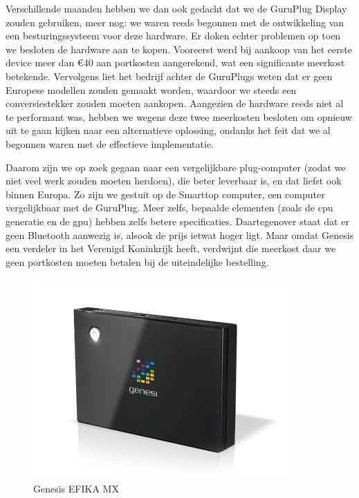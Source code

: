Verschillende maanden hebben we dan ook gedacht dat we de GuruPlug Display zouden gebruiken, meer nog: we waren reeds begonnen met de ontwikkeling van een besturingssysteem voor deze hardware. Er doken echter problemen op toen we besloten de hardware aan te kopen. Vooreerst werd bij aankoop van het eerste device meer dan \euro 40 aan portkosten aangerekend, wat een significante meerkost betekende. Vervolgens liet het bedrijf achter de GuruPlugs weten dat er geen Europese modellen zouden gemaakt worden, waardoor we steeds een conversiestekker zouden moeten aankopen. Aangezien de hardware reeds niet al te performant was, hebben we wegens deze twee meerkosten besloten om opnieuw uit te gaan kijken naar een alternatieve oplossing, ondanks het feit dat we al begonnen waren met de effectieve implementatie.

Daarom zijn we op zoek gegaan naar een vergelijkbare plug-computer (zodat we niet veel werk zouden moeten herdoen), die beter leverbaar is, en dat liefst ook binnen Europa. Zo zijn we gestuit op de  Smarttop computer, een computer vergelijkbaar met de GuruPlug. Meer zelfs, bepaalde elementen (zoals de \ac{cpu} generatie en de \ac{gpu}) hebben zelfs betere specificaties. Daartegenover staat dat er geen Bluetooth aanwezig is, alsook de prijs ietwat hoger ligt. Maar omdat Genesis een verdeler in het Verenigd Koninkrijk heeft, verdwijnt die meerkost daar we geen portkosten moeten betalen bij de uiteindelijke bestelling.

\begin{figure}
	\includegraphics[width=\textwidth]{afbeeldingen/EFIKA_MX}
	\caption{Genesis EFIKA MX}
\end{figure}

